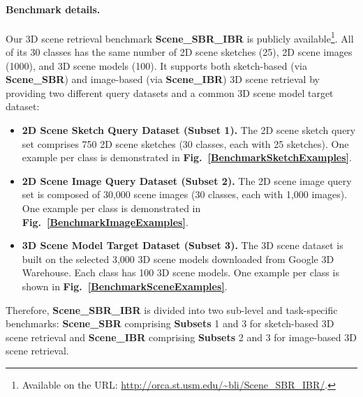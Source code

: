 \documentclass[times, 10pt,twocolumn]{article}
\begin{document}
\paragraph{Benchmark details.} Our 3D scene retrieval benchmark \textbf{Scene\_SBR\_IBR} is publicly available\footnote{Available on the URL: \url{http://orca.st.usm.edu/~bli/Scene_SBR_IBR/}.}. All of its 30 classes has the same number of 2D scene sketches (25), 2D scene images (1000), and 3D scene models (100). It supports both sketch-based (via \textbf{Scene\_SBR}) and image-based (via \textbf{Scene\_IBR}) 3D scene retrieval by providing two different query datasets and a common 3D scene model target dataset:
\begin{itemize}
    \item \textbf{2D Scene Sketch Query Dataset (Subset 1).} The 2D scene sketch query set comprises 750 2D scene sketches (30 classes, each with 25 sketches). One example per class is demonstrated in \textbf{Fig.~\ref{BenchmarkSketchExamples}}.
    \item \textbf{2D Scene Image Query Dataset (Subset 2).} The 2D scene image query set is composed of 30,000 scene images (30 classes, each with 1,000 images). One example per class is demonstrated in \textbf{Fig.~\ref{BenchmarkImageExamples}}.
    \item \textbf{3D Scene Model Target Dataset (Subset 3).} The 3D scene dataset is built on the selected 3,000 3D scene models downloaded from Google 3D Warehouse. Each class has 100 3D scene models. One example per class is shown in \textbf{Fig.~\ref{BenchmarkSceneExamples}}.
\end{itemize}
Therefore, \textbf{Scene\_SBR\_IBR} is divided into two sub-level and task-specific benchmarks:  \textbf{Scene\_SBR} comprising \textbf{Subsets} 1 and 3 for sketch-based 3D scene retrieval and \textbf{Scene\_IBR} comprising \textbf{Subsets} 2 and 3 for image-based 3D scene retrieval. 
\end{document}
